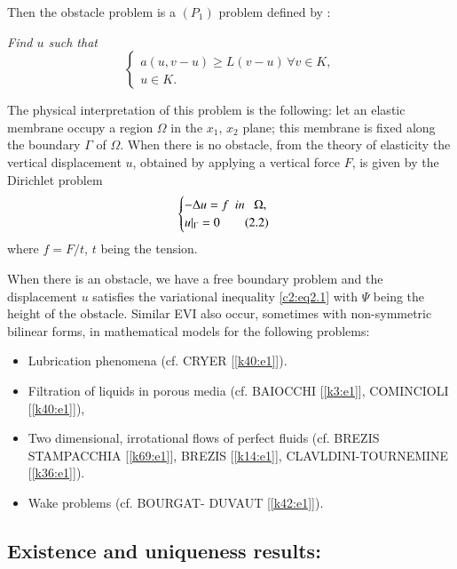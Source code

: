 Then the obstacle problem is a $(P_1)$ problem defined by :
 
\textit{Find $u$ such that}
\begin{equation}
\begin{cases}
 a(u, v-u) \geq L(v-u)\, \forall v \in K,\\
 u \in K.
\end{cases} \tag{2.1}\label{c2:eq2.1}
 \end{equation} 
 
The physical interpretation of this problem is the following: let an
elastic membrane occupy a region $\Omega$ in the $x_1$, $x_2$ plane;
this membrane is fixed along the boundary $\Gamma$ of $\Omega$. When
there is no obstacle, from the theory of elasticity the vertical
displacement $u$, obtained by applying a vertical force $F$, is given
by the Dirichlet problem 
\begin{equation}
\begin{cases}
-\Delta u = f ~~\text{\em in }~~\Omega,\\
u|_\Gamma = 0\tag{2.2}\label{c2:eq2.2}
\end{cases}
\end{equation}\pageoriginale 
 where $f = F/t$, $t$ being the tension.
 
 When there is an obstacle, we have a free boundary problem and the
 displacement $u$ satisfies the variational inequality \eqref{c2:eq2.1} with
 $\Psi$  being the height of the obstacle. Similar EVI also occur,
 sometimes with non-symmetric bilinear forms, in mathematical models
 for the following problems: 
 
 \begin{itemize}
\item Lubrication phenomena (cf. CRYER [\ref{k40:e1}]).
\item Filtration of liquids in porous media (cf. BAIOCCHI
  [\ref{k3:e1}], COMINCIOLI [\ref{k40:e1}]), 
\item Two dimensional, irrotational flows of perfect fluids
  (cf. BREZIS STAMPACCHIA [\ref{k69:e1}], BREZIS [\ref{k14:e1}],
  {\small CLAVLDINI-TOURNEMINE} [\ref{k36:e1}]).  
\item Wake problems (cf. BOURGAT- DUVAUT [\ref{k42:e1}]).
 \end{itemize} 
 
\subsection{Existence and uniqueness results:}\label{c2:ss2.2} %
 
